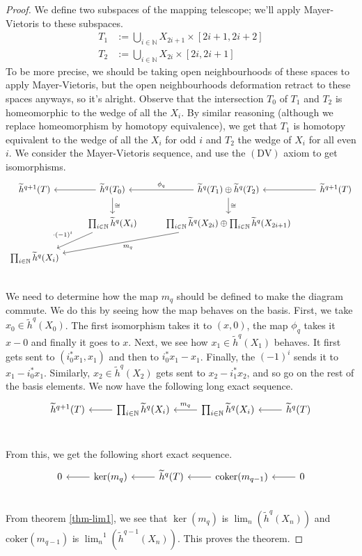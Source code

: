 \documentclass[12pt, notitlepage]{article}
\theoremstyle{definition}
\newcommand{\redco}{\widetilde{h}}
\newcommand{\coker}{\mathrm{coker}}
\begin{document}
\begin{proof}
  We define two subspaces of the mapping telescope; we'll apply Mayer-Vietoris to these subspaces.
  \begin{align*}
    T_1 &:= \bigcup_{i \in \mathbb{N}} X_{2i+1} \times [2i+1, 2i+2] \\
    T_2 &:= \bigcup_{i \in \mathbb{N}} X_{2i} \times [2i, 2i+1] 
  \end{align*}
  To be more precise, we should be taking open neighbourhoods of these spaces to apply
  Mayer-Vietoris, but the open neighbourhoods deformation retract to these spaces anyways, so it's
  alright.  Observe that the intersection $T_0$ of $T_1$ and $T_2$ is homeomorphic to the wedge of
  all the $X_i$.  By similar reasoning (although we replace homeomorphism by homotopy equivalence),
  we get that $T_1$ is homotopy equivalent to the wedge of all the $X_i$ for odd $i$ and $T_2$ the
  wedge of $X_i$ for all even $i$. We consider the Mayer-Vietoris sequence, and use the
  $(\mathrm{DV})$ axiom to get isomorphisms.
  \[
    \begin{tikzcd}
      \redco^{q+1}(T) & \redco^{q}(T_0) \ar[l] \ar[d, "\cong"] & \redco^{q}(T_1) \oplus \redco^{q}(T_2) \ar[l, swap, "\phi_q"] \ar[d, "\cong"] & \redco^{q+1}(T) \ar[l] \\
      & \prod_{i \in \mathbb{N}} \redco^{q}(X_i) \ar[dl, swap, "\cdot (-1)^i"] & \prod_{i \in \mathbb{N}} \redco^{q}(X_{2i}) \oplus \prod_{i \in \mathbb{N}} \redco^{q}(X_{2i+1}) \ar[dll, "m_q"] &   \\
      \prod_{i \in \mathbb{N}} \redco^{q}(X_i) & & & \\
    \end{tikzcd}
  \]
  We need to determine how the map $m_q$ should be defined to make the diagram commute.  We do this
  by seeing how the map behaves on the basis. First, we take $x_0 \in \redco^{q}(X_0)$. The first
  isomorphism takes it to $(x, 0)$, the map $\phi_q$ takes it $x-0$ and finally it goes to
  $x$. Next, we see how $x_1 \in \redco^{q}(X_1)$ behaves. It first gets sent to
  $(i_0^{\ast}x_1, x_1)$ and then to $i_0^{\ast}x_1 - x_1$.  Finally, the $(-1)^i$ sends it to
  $x_1 - i_0^{\ast}x_1$. Similarly, $x_2 \in \redco^{q}(X_2)$ gets sent to $x_2-i_1^{\ast}x_2$, and
  so go on the rest of the basis elements. We now have the following long exact sequence.
  \[
    \begin{tikzcd}
      \redco^{q+1}(T) & \prod_{i \in \mathbb{N}}\redco^{q} (X_i) \ar[l] & \prod_{i \in \mathbb{N}}\redco^{q} (X_i) \ar[swap, l, "m_q"] & \redco^{q}(T) \ar[l] \\
    \end{tikzcd}
  \]

  From this, we get the following short exact sequence.
  \[
    \begin{tikzcd}
      0 & \ker(m_q) \ar[l] & \redco^{q}(T) \ar[l] & \coker(m_{q-1}) \ar[l] & 0 \ar[l] \\
    \end{tikzcd}
  \]
  From theorem \ref{thm-lim1}, we see that $\ker(m_q)$ is $\lim_n(\redco^{q}(X_n))$ and
  $\coker(m_{q-1})$ is ${\lim_n}^1(\redco^{q-1}(X_n))$. This proves the theorem.

\end{proof}



\end{document}
